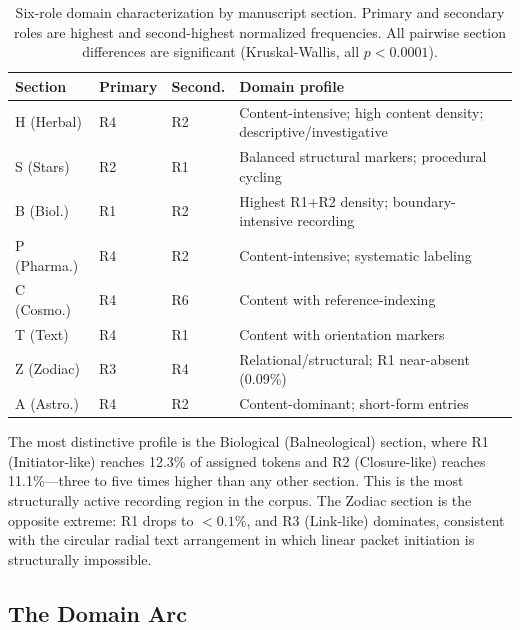 \documentclass[11pt,a4paper,twocolumn]{article}
\begin{document}
\begin{table}[H]
\centering
\caption{Six-role domain characterization by manuscript section. Primary and secondary roles are highest and second-highest normalized frequencies. All pairwise section differences are significant (Kruskal-Wallis, all $p < 0.0001$).}
\label{tab:domains}
\small
\begin{tabular}{@{}p{1.3cm}p{0.9cm}p{0.9cm}p{2.8cm}@{}}
\toprule
\textbf{Section} & \textbf{Primary} & \textbf{Second.} & \textbf{Domain profile} \\
\midrule
\rowcolor{lightgray}
H (Herbal) & \colorbox{ccontent!25}{R4} & \colorbox{cclose!18}{R2} & Content-intensive; high content density; descriptive/investigative \\
S (Stars) & \colorbox{cclose!18}{R2} & \colorbox{cinit!18}{R1} & Balanced structural markers; procedural cycling \\
\rowcolor{lightgray}
B (Biol.) & \colorbox{cinit!18}{R1} & \colorbox{cclose!18}{R2} & Highest R1+R2 density; boundary-intensive recording \\
P (Pharma.) & \colorbox{ccontent!25}{R4} & \colorbox{cclose!18}{R2} & Content-intensive; systematic labeling \\
\rowcolor{lightgray}
C (Cosmo.) & \colorbox{ccontent!25}{R4} & \colorbox{cref!18}{R6} & Content with reference-indexing \\
T (Text) & \colorbox{ccontent!25}{R4} & \colorbox{cinit!18}{R1} & Content with orientation markers \\
\rowcolor{lightgray}
Z (Zodiac) & \colorbox{clink!25}{R3} & \colorbox{ccontent!25}{R4} & Relational/structural; R1 near-absent (0.09\%) \\
A (Astro.) & \colorbox{ccontent!25}{R4} & \colorbox{cclose!18}{R2} & Content-dominant; short-form entries \\
\bottomrule
\end{tabular}
\end{table}

The most distinctive profile is the Biological (Balneological) section, where R1 (Initiator-like) reaches 12.3\% of assigned tokens and R2 (Closure-like) reaches 11.1\%---three to five times higher than any other section. This is the most structurally active recording region in the corpus. The Zodiac section is the opposite extreme: R1 drops to $< 0.1\%$, and R3 (Link-like) dominates, consistent with the circular radial text arrangement in which linear packet initiation is structurally impossible.

\subsection{The Domain Arc}
\end{document}
